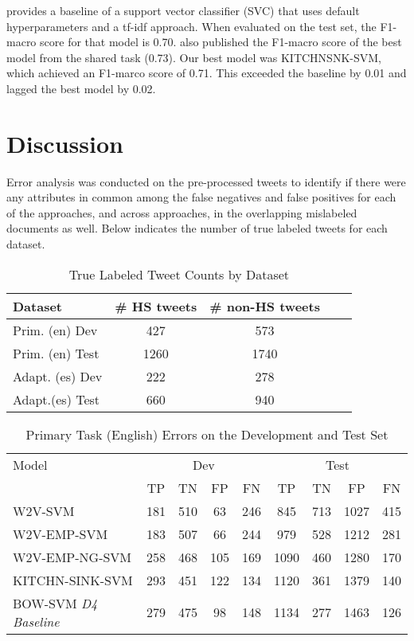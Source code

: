 \documentclass[11pt,a4paper]{article}
\begin{document}
\citet{basile-etal-2019-semeval} provides a baseline of a support vector classifier (SVC) that uses default hyperparameters and a tf-idf approach. When evaluated on the test set, the F1-macro score for that model is 0.70. \citet{basile-etal-2019-semeval} also published the F1-macro score of the best model from the shared task (0.73). Our best model was KITCHNSNK-SVM, which achieved an F1-marco score of 0.71. This exceeded the baseline by 0.01 and lagged the best model by 0.02. 


\section{Discussion}
Error analysis was conducted on the pre-processed tweets to identify if there were any attributes in common among the false negatives and false positives for each of the approaches, and across approaches, in the overlapping mislabeled documents as well. Below indicates the number of true labeled tweets for each dataset.

\begin{table}[h]
\centering
\caption{True Labeled Tweet Counts by Dataset}
\label{tab:true_labels}
\begin{tabular}{lcccc}
\hline
Dataset & \# HS tweets & \# non-HS tweets \\
\hline
Prim. (en) Dev & 427 & 573 \\
Prim. (en) Test & 1260 & 1740 \\
Adapt. (es) Dev & 222 & 278 \\
Adapt.(es) Test & 660 & 940 \\
\hline
\end{tabular}
\end{table}


\begin{table}[h]
\centering
\caption{Primary Task (English) Errors on the Development and Test Set}
\label{tab:prim_class_test}
\tiny
\begin{tabular}{lcccc|cccc}
\hline
Model
            & \multicolumn{4}{c|}{Dev} & \multicolumn{4}{c}{Test} \\
    & TP & TN & FP & FN & TP & TN & FP & FN \\
\hline
W2V-SVM        & 181 & 510 & 63  & 246 & 845  & 713 & 1027 & 415 \\
W2V-EMP-SVM    & 183 & 507 & 66  & 244 & 979  & 528 & 1212 & 281 \\
W2V-EMP-NG-SVM & 258 & 468 & 105 & 169 & 1090 & 460 & 1280 & 170 \\
KITCHN-SINK-SVM & 293 & 451 & 122 & 134 & 1120 & 361 & 1379 & 140 \\
BOW-SVM \textit{D4 Baseline} & 279 & 475 & 98  & 148 & 1134 & 277 & 1463 & 126 \\
\hline
\end{tabular}
\end{table}
\end{document}
